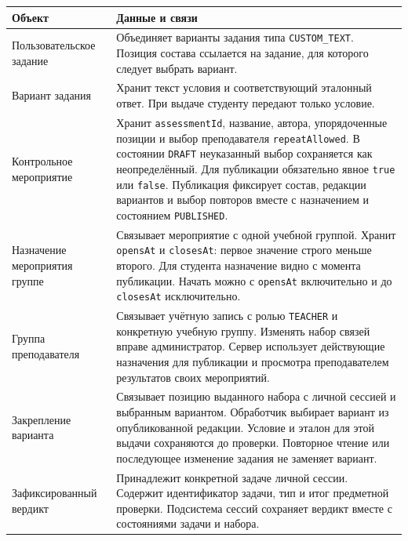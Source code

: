 \documentclass[12pt,a4paper]{article}
\newcounter{none} %
\begin{document}
{\def\LTcaptype{none} %
\begin{longtable}[]{@{}
  >{\raggedright\arraybackslash}p{}
  >{\raggedright\arraybackslash}p{}@{}}
\toprule\noalign{}
\begin{minipage}[b]{\linewidth}\raggedright
Объект
\end{minipage} & \begin{minipage}[b]{\linewidth}\raggedright
Данные и связи
\end{minipage} \\
\midrule\noalign{}
\endhead
\bottomrule\noalign{}
\endlastfoot
Пользовательское задание & Объединяет варианты задания типа \texttt{CUSTOM\_\allowbreak{}TEXT}. Позиция состава ссылается на задание, для которого следует выбрать вариант. \\
Вариант задания & Хранит текст условия и соответствующий эталонный ответ. При выдаче студенту передают только условие. \\
Контрольное мероприятие & Хранит \texttt{assessment\allowbreak{}Id}, название, автора, упорядоченные позиции и выбор преподавателя \texttt{repeat\allowbreak{}Allowed}. В состоянии \texttt{DRAFT} неуказанный выбор сохраняется как неопределённый. Для публикации обязательно явное \texttt{true} или \texttt{false}. Публикация фиксирует состав, редакции вариантов и выбор повторов вместе с назначением и состоянием \texttt{PUBLISHED}. \\
Назначение мероприятия группе & Связывает мероприятие с одной учебной группой. Хранит \texttt{opensAt} и \texttt{closesAt}: первое значение строго меньше второго. Для студента назначение видно с момента публикации. Начать можно с \texttt{opensAt} включительно и до \texttt{closesAt} исключительно. \\
Группа преподавателя & Связывает учётную запись с ролью \texttt{TEACHER} и конкретную учебную группу. Изменять набор связей вправе администратор. Сервер использует действующие назначения для публикации и просмотра преподавателем результатов своих мероприятий. \\
Закрепление варианта & Связывает позицию выданного набора с личной сессией и выбранным вариантом. Обработчик выбирает вариант из опубликованной редакции. Условие и эталон для этой выдачи сохраняются до проверки. Повторное чтение или последующее изменение задания не заменяет вариант. \\
Зафиксированный вердикт & Принадлежит конкретной задаче личной сессии. Содержит идентификатор задачи, тип и итог предметной проверки. Подсистема сессий сохраняет вердикт вместе с состояниями задачи и набора. \\
\end{longtable}
}
\end{document}

